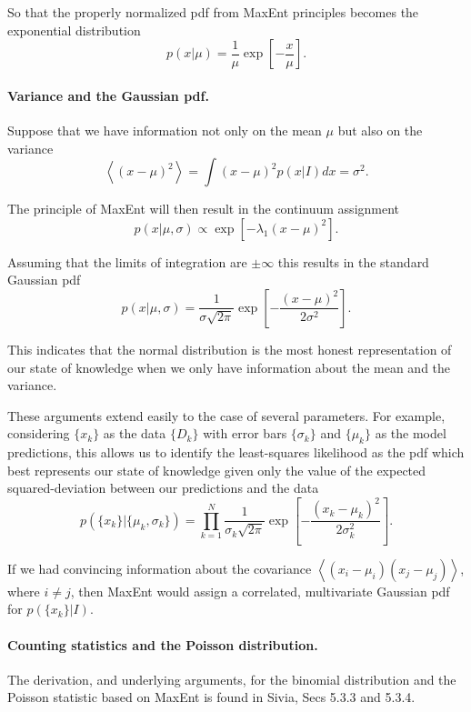 \documentclass[%
oneside,                 %
final,                   %
10pt]{article}
\newenvironment{notice_mdfboxadmon}[1][]{
\begin{notice_mdfboxmdframed}[frametitle=#1]
}
{
\end{notice_mdfboxmdframed}
}
\begin{document}
So that the properly normalized pdf from MaxEnt principles becomes the exponential distribution
\[
p(x|\mu) = \frac{1}{\mu} \exp \left[ -\frac{x}{\mu} \right].
\]

\paragraph{Variance and the Gaussian pdf.}
Suppose that we have information not only on the mean $\mu$ but also on the variance
\[
\left\langle (x-\mu)^2 \right\rangle = \int (x-\mu)^2 p(x|I) dx = \sigma^2.
\]

The principle of MaxEnt will then result in the continuum assignment
\[
p(x|\mu,\sigma) \propto \exp \left[ - \lambda_1 ( x - \mu )^2 \right].
\]

Assuming that the limits of integration are $\pm \infty$ this results in the standard Gaussian pdf
\[
p(x|\mu,\sigma) = \frac{1}{\sigma \sqrt{2\pi}} \exp \left[ - \frac{( x - \mu )^2}{2\sigma^2} \right].
\]

This indicates that the normal distribution is the most honest representation of our state of knowledge when we only have information about the mean and the variance.


\begin{notice_mdfboxadmon}[Notice]
These arguments extend easily to the case of several parameters. For example, considering $\{x_k\}$ as the data $\{ D_k\}$ with error bars $\{\sigma_k\}$ and $\{\mu_k\}$ as the model predictions, this allows us to identify the least-squares likelihood as the pdf which best represents our state of knowledge given only the value of the expected squared-deviation between our predictions and the data
\[
p\left( \{x_k\} | \{\mu_k, \sigma_k\} \right) = \prod_{k=1}^N \frac{1}{\sigma_k \sqrt{2\pi}} \exp \left[ - \frac{( x_k - \mu_k )^2}{2\sigma_k^2} \right].
\]

If we had convincing information about the covariance $\left\langle \left( x_i - \mu_i \right) \left( x_j - \mu_j \right) \right\rangle$, where $i \neq j$, then MaxEnt would assign a correlated, multivariate Gaussian pdf for $p\left( \{ x_k \} | I \right)$.
\end{notice_mdfboxadmon} %



\paragraph{Counting statistics and the Poisson distribution.}
The derivation, and underlying arguments, for the binomial distribution and the Poisson statistic based on MaxEnt is found in Sivia, Secs 5.3.3 and 5.3.4.


\end{document}

